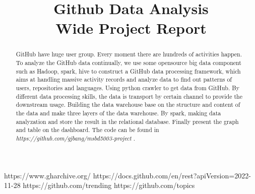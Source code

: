 \documentclass[conference]{IEEEtran}
\begin{document}
\title{Github Data Analysis\\
{\small Wide Project Report}
}

\author{
\and
{}
}

\maketitle

\begin{abstract}
    GitHub have huge user group. Every moment there are hundreds of activities happen. To analyze the GitHub data continually, we use some opensource big data component such as Hadoop, spark, hive to construct a GitHub data processing framework, which aims at handling massive activity records and analyze data to find out patterns of users, repositories and languages. Using python crawler to get data from GitHub. By different data processing skills, the data is transport by certain channel to provide the downstream usage. Building the data warehouse base on the structure and content of the data and make three layers of the data warehouse. By spark, making data analyzation and store the result in the relational database. Finally present the graph and table on the dashboard. The code can be found in \textit{https://github.com/gjbang/msbd5003-project} .
\end{abstract}























\begin{thebibliography}{00}
https://www.gharchive.org/
https://docs.github.com/en/rest?apiVersion=2022-11-28
https://github.com/trending
https://github.com/topics
\end{thebibliography}


\end{document}

